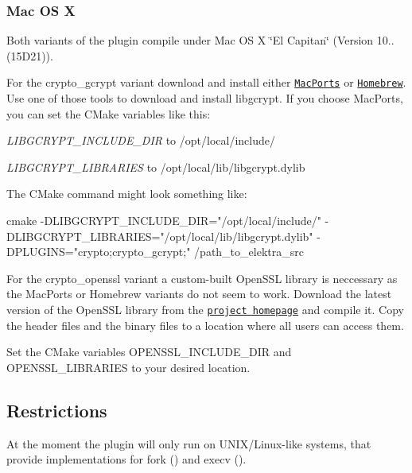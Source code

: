 \subsubsection*{Mac O\+S X}

Both variants of the plugin compile under Mac O\+S X \char`\"{}\+El Capitan\char`\"{} (Version 10.. (15\+D21)).

For the {\ttfamily crypto\+\_\+gcrypt} variant download and install either \href{https://www.macports.org/}{\tt Mac\+Ports} or \href{http://brew.sh/}{\tt Homebrew}. Use one of those tools to download and install {\ttfamily libgcrypt}. If you choose Mac\+Ports, you can set the C\+Make variables like this\+:


\begin{DoxyItemize}
\item {\itshape L\+I\+B\+G\+C\+R\+Y\+P\+T\+\_\+\+I\+N\+C\+L\+U\+D\+E\+\_\+\+D\+I\+R} to {\ttfamily /opt/local/include/}
\item {\itshape L\+I\+B\+G\+C\+R\+Y\+P\+T\+\_\+\+L\+I\+B\+R\+A\+R\+I\+E\+S} to {\ttfamily /opt/local/lib/libgcrypt.dylib}
\end{DoxyItemize}

The C\+Make command might look something like\+: \begin{DoxyVerb}    cmake -DLIBGCRYPT_INCLUDE_DIR="/opt/local/include/" -DLIBGCRYPT_LIBRARIES="/opt/local/lib/libgcrypt.dylib" -DPLUGINS="crypto;crypto_gcrypt;" /path_to_elektra_src
\end{DoxyVerb}


For the {\ttfamily crypto\+\_\+openssl} variant a custom-\/built Open\+S\+S\+L library is neccessary as the Mac\+Ports or Homebrew variants do not seem to work. Download the latest version of the Open\+S\+S\+L library from the \href{https://www.openssl.org/source/}{\tt project homepage} and compile it. Copy the header files and the binary files to a location where all users can access them.

Set the C\+Make variables {\ttfamily O\+P\+E\+N\+S\+S\+L\+\_\+\+I\+N\+C\+L\+U\+D\+E\+\_\+\+D\+I\+R} and {\ttfamily O\+P\+E\+N\+S\+S\+L\+\_\+\+L\+I\+B\+R\+A\+R\+I\+E\+S} to your desired location.

\subsection*{Restrictions}

At the moment the plugin will only run on U\+N\+I\+X/\+Linux-\/like systems, that provide implementations for {\ttfamily fork ()} and {\ttfamily execv ()}.

